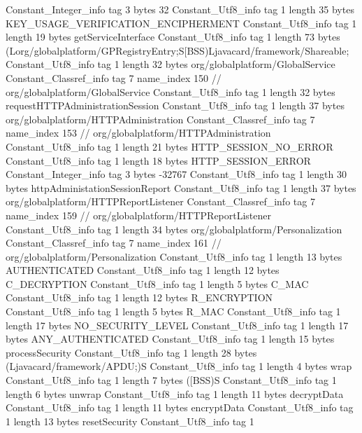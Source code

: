 {{		Constant_Integer_info {
			tag	3
			bytes	32
		}
		Constant_Utf8_info {
			tag	1
			length	35
			bytes	KEY_USAGE_VERIFICATION_ENCIPHERMENT
		}
		Constant_Utf8_info {
			tag	1
			length	19
			bytes	getServiceInterface
		}
		Constant_Utf8_info {
			tag	1
			length	73
			bytes	(Lorg/globalplatform/GPRegistryEntry;S[BSS)Ljavacard/framework/Shareable;
		}
		Constant_Utf8_info {
			tag	1
			length	32
			bytes	org/globalplatform/GlobalService
		}
		Constant_Classref_info {
			tag	7
			name_index	150		// org/globalplatform/GlobalService
		}
		Constant_Utf8_info {
			tag	1
			length	32
			bytes	requestHTTPAdministrationSession
		}
		Constant_Utf8_info {
			tag	1
			length	37
			bytes	org/globalplatform/HTTPAdministration
		}
		Constant_Classref_info {
			tag	7
			name_index	153		// org/globalplatform/HTTPAdministration
		}
		Constant_Utf8_info {
			tag	1
			length	21
			bytes	HTTP_SESSION_NO_ERROR
		}
		Constant_Utf8_info {
			tag	1
			length	18
			bytes	HTTP_SESSION_ERROR
		}
		Constant_Integer_info {
			tag	3
			bytes	-32767
		}
		Constant_Utf8_info {
			tag	1
			length	30
			bytes	httpAdministationSessionReport
		}
		Constant_Utf8_info {
			tag	1
			length	37
			bytes	org/globalplatform/HTTPReportListener
		}
		Constant_Classref_info {
			tag	7
			name_index	159		// org/globalplatform/HTTPReportListener
		}
		Constant_Utf8_info {
			tag	1
			length	34
			bytes	org/globalplatform/Personalization
		}
		Constant_Classref_info {
			tag	7
			name_index	161		// org/globalplatform/Personalization
		}
		Constant_Utf8_info {
			tag	1
			length	13
			bytes	AUTHENTICATED
		}
		Constant_Utf8_info {
			tag	1
			length	12
			bytes	C_DECRYPTION
		}
		Constant_Utf8_info {
			tag	1
			length	5
			bytes	C_MAC
		}
		Constant_Utf8_info {
			tag	1
			length	12
			bytes	R_ENCRYPTION
		}
		Constant_Utf8_info {
			tag	1
			length	5
			bytes	R_MAC
		}
		Constant_Utf8_info {
			tag	1
			length	17
			bytes	NO_SECURITY_LEVEL
		}
		Constant_Utf8_info {
			tag	1
			length	17
			bytes	ANY_AUTHENTICATED
		}
		Constant_Utf8_info {
			tag	1
			length	15
			bytes	processSecurity
		}
		Constant_Utf8_info {
			tag	1
			length	28
			bytes	(Ljavacard/framework/APDU;)S
		}
		Constant_Utf8_info {
			tag	1
			length	4
			bytes	wrap
		}
		Constant_Utf8_info {
			tag	1
			length	7
			bytes	([BSS)S
		}
		Constant_Utf8_info {
			tag	1
			length	6
			bytes	unwrap
		}
		Constant_Utf8_info {
			tag	1
			length	11
			bytes	decryptData
		}
		Constant_Utf8_info {
			tag	1
			length	11
			bytes	encryptData
		}
		Constant_Utf8_info {
			tag	1
			length	13
			bytes	resetSecurity
		}
		Constant_Utf8_info {
			tag	1
}}}
